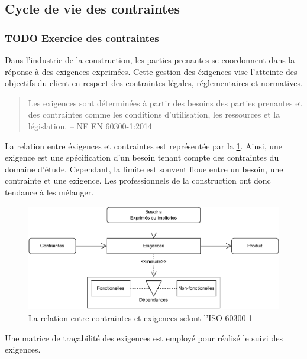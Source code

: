 \documentclass[a4paper,12pt]{article}
\begin{document}
\subsection{Cycle de vie des contraintes}
\label{sec:orgfb7d5af}
\subsubsection{{\bfseries\sffamily TODO} Exercice des contraintes}
\label{sec:org9cb545d}
Dans l'industrie de la construction, les parties prenantes se coordonnent dans la réponse à des exigences exprimées. Cette gestion des éxigences vise l'atteinte des objectifs du client en respect des contraintes légales, réglementaires et normatives.

\begin{quote}
Les exigences sont déterminées à partir des besoins des parties prenantes et des contraintes comme les conditions d’utilisation, les ressources et la législation. -- NF EN 60300-1:2014\autocite{GestionSureteFonctionnement2014}
\end{quote}

La relation entre éxigences et contraintes est représentée par la \ref{fig:orgd198976}. Ainsi, une exigence est une spécification d'un besoin tenant compte des contraintes du domaine d'étude. Cependant, la limite est souvent floue entre un besoin, une contrainte et une exigence. Les professionnels de la construction ont donc tendance à les mélanger.

\begin{figure}[htbp]
\centering
\includegraphics[width=.9\linewidth]{./svg/relation-contraintes-exigences.pdf}
\caption{\label{fig:orgd198976}La relation entre contraintes et exigences selont l'ISO 60300-1\autocite{GestionSureteFonctionnement2014}}
\end{figure}

Une matrice de traçabilité des exigences est employé pour réalisé le suivi des exigences.
\end{document}
